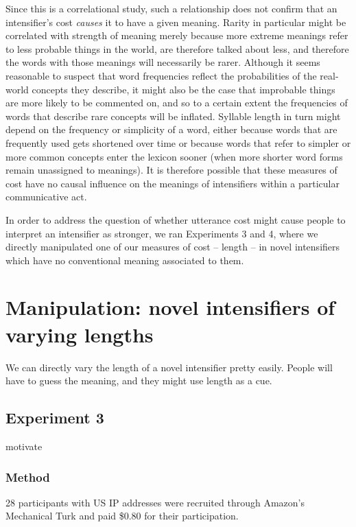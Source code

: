 \documentclass[a4paper,10pt]{article}
\newcommand{\todo}[1]{{\color{red}#1}}
\begin{document}
      Since this is a correlational study, such a relationship does not confirm that an intensifier's cost \emph{causes} it to have a given meaning.%
      Rarity in particular might be correlated with strength of meaning merely because more extreme meanings refer to less probable things in the world, are therefore talked about less, and therefore the words with those meanings will necessarily be rarer.
      Although it seems reasonable to suspect that word frequencies reflect the probabilities of the real-world concepts they describe, it might also be the case that improbable things are more likely to be commented on, and so to a certain extent the frequencies of words that describe rare concepts will be inflated. Syllable length in turn might depend on the frequency or simplicity of a word, either because words that are frequently used gets shortened over time \cite{someone} or because words that refer to simpler or more common concepts enter the lexicon sooner (when more shorter word forms remain unassigned to meanings). It is therefore possible that these measures of cost have no causal influence on the meanings of intensifiers within a particular communicative act.
      
      In order to address the question of whether utterance cost might cause people to interpret an intensifier as stronger, we ran Experiments 3 and 4, where we directly manipulated one of our measures of cost -- length -- in novel intensifiers which have no conventional meaning associated to them.

\section{Manipulation: novel intensifiers of varying lengths}
  \todo{We can directly vary the length of a novel intensifier pretty easily. People will have to guess the meaning, and they might use length as a cue.}

  \subsection{Experiment 3}
    \todo{motivate}

    \subsubsection{Method}
      28 participants with US IP addresses were recruited through Amazon's Mechanical Turk and paid \$0.80 for their participation.
\end{document}
